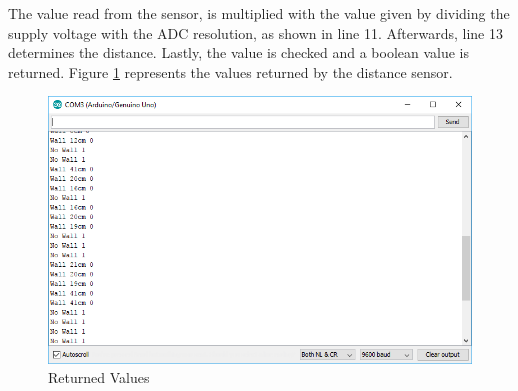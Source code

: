 The value read from the sensor, is multiplied with the value given by
dividing the supply voltage with the ADC resolution, as shown in line 11.
Afterwards, line 13 determines the distance.
Lastly, the value is checked and a boolean value is returned.
\clearpage
Figure \ref{fig:arduino_values} represents the values returned by the
distance sensor.

\begin{figure}[htp]
	\centering
	\includegraphics[width=\textwidth]{figures/scan/SerialCom.png}
	\caption{Returned Values}
	\label{fig:arduino_values}
\end{figure}